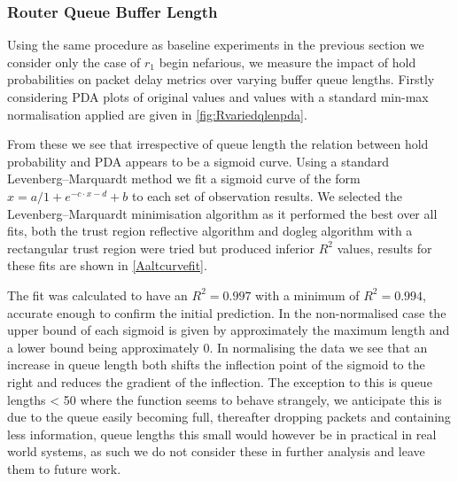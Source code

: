 \subsubsection*{Router Queue Buffer Length}
Using the same procedure as baseline experiments in the previous section we consider only the case of $r_1$ begin nefarious, we measure the impact of hold probabilities on packet delay metrics over varying buffer queue lengths. Firstly considering PDA plots of original values and values with a standard min-max normalisation applied are given in \cref{fig:Rvariedqlenpda}.\par
From these we see that irrespective of queue length the relation between hold probability and PDA appears to be a sigmoid curve. Using a standard Levenberg–Marquardt method \cite{osborne_nonlinear_1976} we fit a sigmoid curve of the form $x=a/1+e^{-c\cdot x-d} + b$ to each set of observation results. We selected the Levenberg–Marquardt minimisation algorithm as it performed the best over all fits, both the trust region reflective algorithm and dogleg algorithm with a rectangular trust region were tried but produced inferior $R^2$ values, results for these fits are shown in \cref{Aaltcurvefit}.\par
The fit was calculated to have an $R^2=0.997$ with a minimum of $R^2=0.994$, accurate enough to confirm the initial prediction. In the non-normalised case the upper bound of each sigmoid is given by approximately the maximum length and a lower bound being approximately 0. In normalising the data we see that an increase in queue length both shifts the inflection point of the sigmoid to the right and reduces the gradient of the inflection. The exception to this is queue lengths < 50 where the function seems to behave strangely, we anticipate this is due to the queue easily becoming full, thereafter dropping packets and containing less information, queue lengths this small would however be in practical in real world systems, as such we do not consider these in further analysis and leave them to future work.\par
